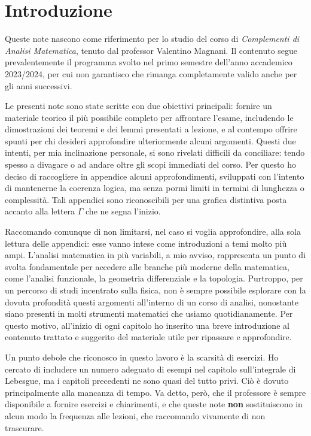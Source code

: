 \documentclass[12pt, twoside, italian]{book}
\begin{document}
	\chapter*{Introduzione}
	\pagestyle{empty}
	\thispagestyle{empty}
	\pagestyle{fancy}
	Queste note nascono come riferimento per lo studio del corso di \emph{Complementi di Analisi Matematica}, tenuto dal professor Valentino Magnani. Il contenuto segue prevalentemente il programma svolto nel primo semestre dell'anno accademico 2023/2024, per cui non garantisco che rimanga completamente valido anche per gli anni successivi.\

	Le presenti note sono state scritte con due obiettivi principali: fornire un materiale teorico il più possibile completo per affrontare l'esame, includendo le dimostrazioni dei teoremi e dei lemmi presentati a lezione, e al contempo offrire spunti per chi desideri approfondire ulteriormente alcuni argomenti. Questi due intenti, per mia inclinazione personale, si sono rivelati difficili da conciliare: tendo spesso a divagare o ad andare oltre gli scopi immediati del corso. Per questo ho deciso di raccogliere in appendice alcuni approfondimenti, sviluppati con l'intento di mantenerne la coerenza logica, ma senza pormi limiti in termini di lunghezza o complessità. Tali appendici sono riconoscibili per una grafica distintiva posta accanto alla lettera $\Gamma$ che ne segna l'inizio.\

	Raccomando comunque di non limitarsi, nel caso si voglia approfondire, alla sola lettura delle appendici: esse vanno intese come introduzioni a temi molto più ampi. L'analisi matematica in più variabili, a mio avviso, rappresenta un punto di svolta fondamentale per accedere alle branche più moderne della matematica, come l'analisi funzionale, la geometria differenziale e la topologia. Purtroppo, per un percorso di studi incentrato sulla fisica, non è sempre possibile esplorare con la dovuta profondità questi argomenti all'interno di un corso di analisi, nonostante siano presenti in molti strumenti matematici che usiamo quotidianamente. Per questo motivo, all'inizio di ogni capitolo ho inserito una breve introduzione al contenuto trattato e suggerito del materiale utile per ripassare e approfondire.\

	Un punto debole che riconosco in questo lavoro è la scarsità di esercizi. Ho cercato di includere un numero adeguato di esempi nel capitolo sull'integrale di Lebesgue, ma i capitoli precedenti ne sono quasi del tutto privi. Ciò è dovuto principalmente alla mancanza di tempo. Va detto, però, che il professore è sempre disponibile a fornire esercizi e chiarimenti, e che queste note \textbf{non} sostituiscono in alcun modo la frequenza alle lezioni, che raccomando vivamente di non trascurare.\
\end{document}
